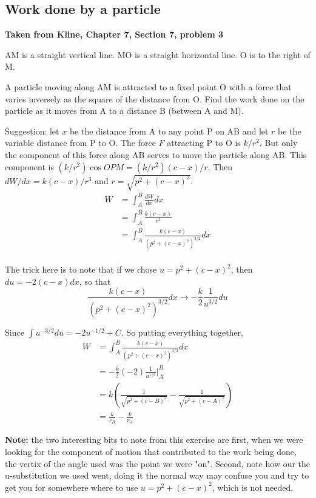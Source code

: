 \subsection{Work done by a particle}

\textbf{Taken from Kline, Chapter 7, Section 7, problem 3}

AM is a straight vertical line.
MO is a straight horizontal line. O is to the right of M.

A particle moving along AM is attracted to a fixed point O with a force that varies inversely
as the square of the distance from O.
Find the work done on the particle as it moves from A to a distance B (between A and M).

Suggestion: let $x$ be the distance from A to any point P on AB
and let $r$ be the variable distance from P to O.
The force $F$ attracting P to O is $k/r^2$.
But only the component of this force along AB serves to move the particle along AB.
This component is $(k/r^2) \cos OPM = (k/r^2) (c-x)/r$.
Then $dW/dx = k (c-x)/r^3$ and $r = \sqrt{p^2 + (c-x)^2}$.
\\

\begin{align*}
W &= \int_{A}^{B} \frac{dW}{dx} dx \\
&= \int_{A}^{B} \frac{k (c-x)}{r^3} \\
&= \int_{A}^{B} \frac{k (c-x)}{\left(p^2 + (c-x)^2\right)^{3/2}} dx \\
\end{align*}

The trick here is to note that if we chose $u = p^2 + (c-x)^2$, then $du = -2(c-x) dx$, so that
$$
\frac{k (c-x)}{\left(p^2 + (c-x)^2\right)^{3/2}} dx \rightarrow -\frac{k}{2}\frac{1}{u^{3/2}} du
$$

Since $\int u^{-3/2} du = -2 u^{-1/2} + C$.
So putting everything together,
\begin{align*}
W &= \int_{A}^{B} \frac{k (c-x)}{\left(p^2 + (c-x)^2\right)^{3/2}} dx \\
&= -\frac{k}{2} (-2) \frac{1}{u^{1/2}} \Big|_{A}^{B} \\
&= k \left( \frac{1}{\sqrt{p^2 + (c-B)^2}} - \frac{1}{\sqrt{p^2 + (c-A)^2}} \right) \\
&= \frac{k}{r_B} - \frac{k}{r_A}
\end{align*}

\textbf{Note:} the two interesting bits to note from this exercise are first, when we were looking for the component
of motion that contributed to the work being done, the vertix of the angle used was the point we were "on".
Second, note how our the u-substitution we used went, doing it the normal way may confuse you
and try to get you for somewhere where to use $u = p^2 + (c-x)^2$, which is not needed.
\\~\\



